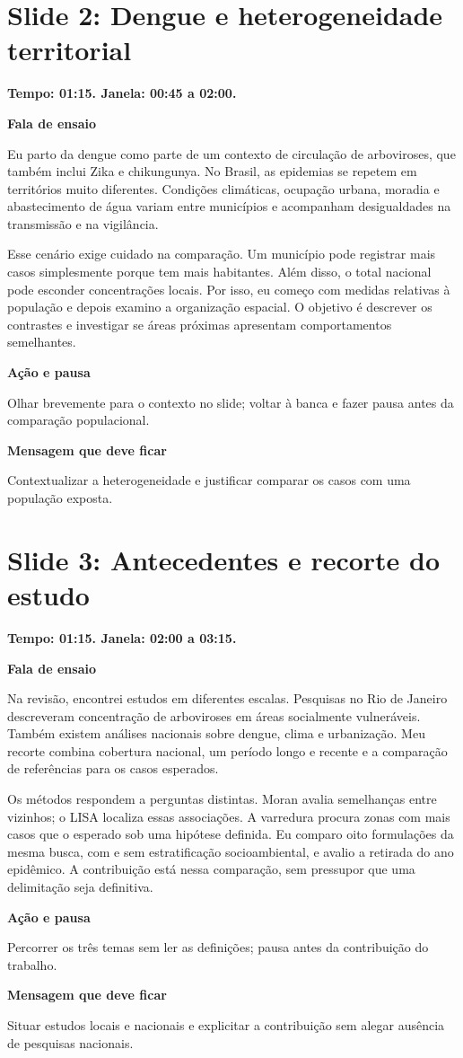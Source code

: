 \documentclass[11pt,a4paper]{article}
\newcommand{\bloco}[1]{\par\Needspace{3\baselineskip}\textbf{#1}\par}
\newcommand{\slide}[2]{\Needspace{13\baselineskip}\section*{Slide #1: #2}}
\begin{document}
\par\begin{minipage}{\textwidth}
\slide{2}{Dengue e heterogeneidade territorial}
{\color{azul}\textbf{Tempo: 01:15. Janela: 00:45 a 02:00.}}\par
\bloco{Fala de ensaio}
Eu parto da dengue como parte de um contexto de circulação de arboviroses, que também inclui Zika e chikungunya. No Brasil, as epidemias se repetem em territórios muito diferentes. Condições climáticas, ocupação urbana, moradia e abastecimento de água variam entre municípios e acompanham desigualdades na transmissão e na vigilância.

Esse cenário exige cuidado na comparação. Um município pode registrar mais casos simplesmente porque tem mais habitantes. Além disso, o total nacional pode esconder concentrações locais. Por isso, eu começo com medidas relativas à população e depois examino a organização espacial. O objetivo é descrever os contrastes e investigar se áreas próximas apresentam comportamentos semelhantes.
\bloco{Ação e pausa}
Olhar brevemente para o contexto no slide; voltar à banca e fazer pausa antes da comparação populacional.
\bloco{Mensagem que deve ficar}
Contextualizar a heterogeneidade e justificar comparar os casos com uma população exposta.
\end{minipage}\par\bigskip
\par\begin{minipage}{\textwidth}
\slide{3}{Antecedentes e recorte do estudo}
{\color{azul}\textbf{Tempo: 01:15. Janela: 02:00 a 03:15.}}\par
\bloco{Fala de ensaio}
Na revisão, encontrei estudos em diferentes escalas. Pesquisas no Rio de Janeiro descreveram concentração de arboviroses em áreas socialmente vulneráveis. Também existem análises nacionais sobre dengue, clima e urbanização. Meu recorte combina cobertura nacional, um período longo e recente e a comparação de referências para os casos esperados.

Os métodos respondem a perguntas distintas. Moran avalia semelhanças entre vizinhos; o LISA localiza essas associações. A varredura procura zonas com mais casos que o esperado sob uma hipótese definida. Eu comparo oito formulações da mesma busca, com e sem estratificação socioambiental, e avalio a retirada do ano epidêmico. A contribuição está nessa comparação, sem pressupor que uma delimitação seja definitiva.
\bloco{Ação e pausa}
Percorrer os três temas sem ler as definições; pausa antes da contribuição do trabalho.
\bloco{Mensagem que deve ficar}
Situar estudos locais e nacionais e explicitar a contribuição sem alegar ausência de pesquisas nacionais.
\end{minipage}\par\bigskip
\end{document}

